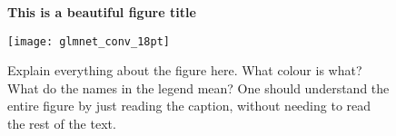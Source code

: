 \begin{figure}[htp]
    \centering
    \textbf{This is a beautiful figure title}\par\medskip
    \texttt{[image: glmnet\_conv\_18pt]}
\caption{Explain everything about the figure here. What colour is what? What do the names in the legend mean? One should understand the entire figure by just reading the caption, without needing to read the rest of the text.}
\label{fig:glmnet_conv}
\end{figure}
